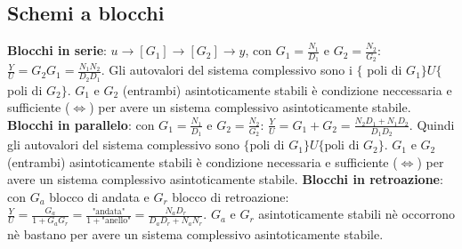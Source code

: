 \begin{landscape}
\begin{multicols*}{3}
    \subsection*{Schemi a blocchi}
    \textbf{Blocchi in serie}: $u \rightarrow [G_1] \rightarrow  [G_2] \rightarrow y$, con $G_1 = \frac{N_1}{D_1}$ e $G_2 = \frac{N_2}{G_2}$: $\frac{Y}{U} = G_2G_1 = \frac{N_1N_2}{D_2D_1}$.\newline 
    Gli autovalori del sistema complessivo sono i $\{$ poli di $G_1\} U \{$ poli di $G_2\}$.\newline
    $G_1$ e $G_2$ (entrambi) asintoticamente stabili è condizione neccessaria e sufficiente ($\Leftrightarrow$) per avere un sistema complessivo asintoticamente stabile.\newline
    \newline
    \textbf{Blocchi in parallelo}: con $G_1 = \frac{N_1}{D_1}$ e $G_2 = \frac{N_2}{G_2}$: $\frac{Y}{U} = G_1 + G_2 = \frac{N_2D_1 + N_1 D_2}{D_1D_2}$.\newline
    Quindi gli autovalori del sistema complessivo sono $\{\text{poli di $G_1$}\} U \{\text{poli di $G_2$}\}$.\newline
    $G_1$ e $G_2$ (entrambi) asintoticamente stabili è condizione necessaria e sufficiente ($\Leftrightarrow$) per avere un sistema complessivo asintoticamente stabile.\newline
    \newline
    \textbf{Blocchi in retroazione}: con $G_a$ blocco di andata e $G_r$ blocco di retroazione: $\frac{Y}{U} = \frac{G_a}{1 + G_aG_r} = \frac{\text{"andata"}}{1+ \text{"anello"}} = \frac{N_aD_r}{D_aD_r +N_aN_r}$. \newline
    $G_a$ e $G_r$ asintoticamente stabili nè occorrono nè bastano per avere un sistema complessivo asintoticamente stabile.

\end{multicols*}
\end{landscape}
